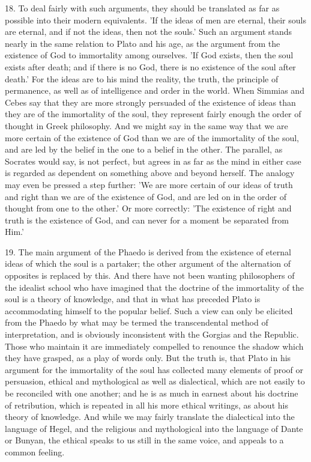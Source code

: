 18. To deal fairly with such arguments, they should be translated as
far as possible into their modern equivalents. 'If the ideas of men are
eternal, their souls are eternal, and if not the ideas, then not the
souls.' Such an argument stands nearly in the same relation to Plato and
his age, as the argument from the existence of God to immortality among
ourselves. 'If God exists, then the soul exists after death; and if
there is no God, there is no existence of the soul after death.' For
the ideas are to his mind the reality, the truth, the principle of
permanence, as well as of intelligence and order in the world. When
Simmias and Cebes say that they are more strongly persuaded of the
existence of ideas than they are of the immortality of the soul, they
represent fairly enough the order of thought in Greek philosophy. And we
might say in the same way that we are more certain of the existence
of God than we are of the immortality of the soul, and are led by the
belief in the one to a belief in the other. The parallel, as Socrates
would say, is not perfect, but agrees in as far as the mind in either
case is regarded as dependent on something above and beyond herself. The
analogy may even be pressed a step further: 'We are more certain of our
ideas of truth and right than we are of the existence of God, and
are led on in the order of thought from one to the other.' Or more
correctly: 'The existence of right and truth is the existence of God,
and can never for a moment be separated from Him.'

19. The main argument of the Phaedo is derived from the existence of
eternal ideas of which the soul is a partaker; the other argument of the
alternation of opposites is replaced by this. And there have not been
wanting philosophers of the idealist school who have imagined that the
doctrine of the immortality of the soul is a theory of knowledge, and
that in what has preceded Plato is accommodating himself to the popular
belief. Such a view can only be elicited from the Phaedo by what may
be termed the transcendental method of interpretation, and is obviously
inconsistent with the Gorgias and the Republic. Those who maintain
it are immediately compelled to renounce the shadow which they have
grasped, as a play of words only. But the truth is, that Plato in his
argument for the immortality of the soul has collected many elements of
proof or persuasion, ethical and mythological as well as dialectical,
which are not easily to be reconciled with one another; and he is as
much in earnest about his doctrine of retribution, which is repeated
in all his more ethical writings, as about his theory of knowledge.
And while we may fairly translate the dialectical into the language of
Hegel, and the religious and mythological into the language of Dante or
Bunyan, the ethical speaks to us still in the same voice, and appeals to
a common feeling.

